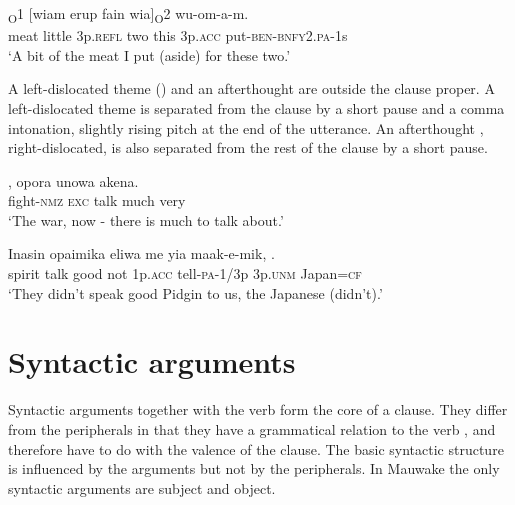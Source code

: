 \ea%
\label{ex:5:x930}
\textsubscript{O}1  [wiam  erup  fain  wia]\textsubscript{O}2 wu-om-a-m. \\
     meat  little  3p.\textsc{refl}  two  this  3p.\textsc{acc} put-\textsc{ben}-\textsc{bnfy}2.\textsc{pa}-1s \\
\glt `A bit of the meat I put (aside) for these two.'
\z

A left-dislocated theme () and an afterthought are outside the clause proper.  A left-dislocated theme  is separated from the clause by a short pause and a comma intonation, slightly rising pitch at the end of the utterance.  An afterthought , right-dislocated, is also separated from the rest of the clause by a short pause.

\ea%
\label{ex:5:x935}
\gll {},  opora  unowa  akena. \\
     fight-\textsc{nmz}  \textsc{exc}  talk  much  very \\
\glt `The war, now - there is much to talk about.'
\z

\ea%
\label{ex:5:x929}
\gll Inasin  opaimika  eliwa  me  yia  maak-e-mik,   . \\
     spirit  talk  good  not  1p.\textsc{acc}  tell-\textsc{pa}-1/3p  3p.\textsc{unm} Japan=\textsc{cf} \\
\glt `They didn't speak good Pidgin to us, the Japanese (didn't).'
\z

\section{Syntactic arguments}

Syntactic arguments together with the verb form the core of a clause. They differ from the peripherals in that they have a grammatical relation to the verb \citep[][77--80]{FoleyEtAl1984}, and therefore have to do with the valence of the clause. The basic syntactic structure is influenced by the arguments but not by the peripherals.  In Mauwake the only syntactic arguments are subject and object. 


